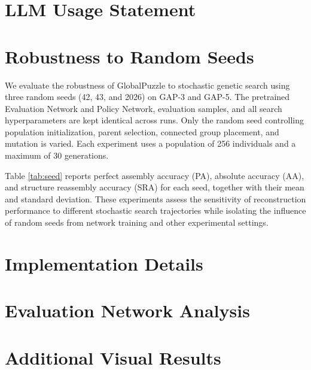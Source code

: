 \documentclass[10pt,twocolumn,letterpaper]{article}
\begin{document}
\pagebreak
\clearpage
\section*{LLM Usage Statement}

{\small


}

\clearpage
\setcounter{page}{1}
\setcounter{section}{0}
\setcounter{table}{0}
\setcounter{figure}{0}
\setcounter{equation}{0}
\renewcommand{\thesection}{\Alph{section}}
\renewcommand{\thetable}{S\arabic{table}}
\renewcommand{\thefigure}{S\arabic{figure}}
\renewcommand{\theequation}{S\arabic{equation}}


\section{Robustness to Random Seeds}
We evaluate the robustness of GlobalPuzzle to stochastic genetic search using three random seeds (42, 43, and 2026) on GAP-3 and GAP-5. The pretrained Evaluation Network and Policy Network, evaluation samples, and all search hyperparameters are kept identical across runs. Only the random seed controlling population initialization, parent selection, connected group placement, and mutation is varied. Each experiment uses a population of 256 individuals and a maximum of 30 generations.

Table \ref{tab:seed} reports perfect assembly accuracy (PA), absolute accuracy (AA), and structure reassembly accuracy (SRA) for each seed, together with their mean and standard deviation. These experiments assess the sensitivity of reconstruction performance to different stochastic search trajectories while isolating the influence of random seeds from network training and other experimental settings.



\section{Implementation Details}

\section{Evaluation Network Analysis}

\section{Additional Visual Results}
\end{document}
